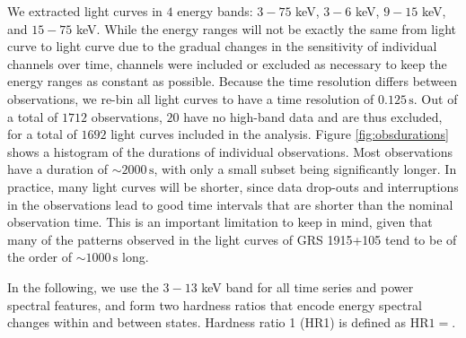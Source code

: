 \documentclass[12pt]{emulateapj}
\begin{document}
We extracted light curves in $4$ energy bands: $3 - 75$ keV, $3 - 6$ keV, $9 - 15$ keV, and $15 - 75$ keV. While the energy ranges will not be exactly the same from light curve to light curve due to the gradual changes in the sensitivity of individual channels over time, channels were included or excluded as necessary to keep the energy ranges as constant as possible. Because the time resolution differs between observations, we re-bin all light curves to have a time resolution of $0.125\,\mathrm{s}$. Out of a total of $1712$ observations, $20$ have no high-band data and are thus excluded, for a total of $1692$ light curves included in the analysis. 
Figure \ref{fig:obsdurations} shows a histogram of the durations of individual observations. Most observations have a duration of $\sim\!2000 \,\mathrm{s}$, with only a small subset being significantly longer.
In practice, many light curves will be shorter, since data drop-outs and interruptions in the observations lead to good time intervals that are shorter than the nominal observation time. This is an important limitation to keep in mind, given that many of the patterns observed in the light curves of GRS 1915+105 tend to be of the order of $\sim\! 1000 \,\mathrm{s}$ long.  

In the following, we use the $3 - 13$ keV band for all time series and power spectral features, and form two hardness ratios that encode energy spectral changes within and between states. Hardness ratio 1 (HR1) is defined as $\mathrm{HR}1 = $.


%



%
%
%
%
%
\end{document}
